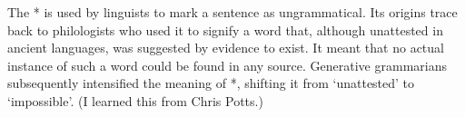 \addchap{\lsPrefaceTitle}
 
 The * is used by linguists to mark a sentence as ungrammatical. Its origins trace back to philologists who used it to signify a word that, although unattested in ancient languages, was suggested by evidence to exist. It meant that no actual instance of such a word could be found in any source. Generative grammarians subsequently intensified the meaning of *, shifting it from `unattested' to `impossible'. (I learned this from Chris Potts.)
